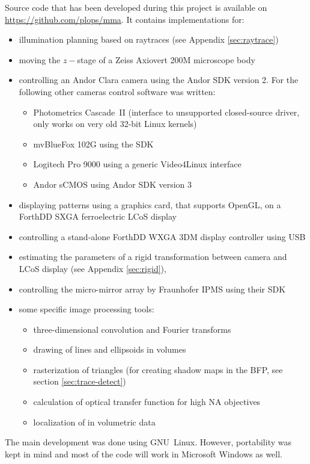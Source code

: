 \documentclass[oneside,a4paper,12pt,BCOR20mm,DIV14]{scrbook}
\begin{document}
Source code that has been developed during this project is available
on \url{https://github.com/plops/mma}.  It contains implementations
for:
\begin{itemize}
\item illumination planning based on raytraces (see Appendix
  \ref{sec:raytrace})
\item moving the $z-$stage of a Zeiss Axiovert 200M microscope body
\item controlling an Andor Clara camera using the Andor SDK version
  2. For the following other cameras control software was written:
  \begin{itemize}
  \item Photometrics Cascade~II (interface to unsupported
    closed-source driver, only works on very old 32-bit Linux kernels)
  \item mvBlueFox 102G using the SDK
  \item Logitech Pro 9000 using a generic Video4Linux interface
  \item Andor sCMOS using Andor SDK version 3
  \end{itemize}
\item displaying patterns using a graphics card, that supports OpenGL,
  on a ForthDD SXGA ferroelectric LCoS display
\item controlling a stand-alone ForthDD WXGA 3DM display controller
  using USB
\item estimating the parameters of a rigid transformation between
  camera and LCoS display (see Appendix \ref{sec:rigid}),
\item controlling the micro-mirror array by Fraunhofer IPMS using
  their SDK
\item some specific image processing tools:
  \begin{itemize}
  \item three-dimensional convolution and Fourier transforms
  \item drawing of lines and ellipsoids in volumes
  \item rasterization of triangles (for creating shadow maps in the
    BFP, see section \ref{sec:trace-detect})
  \item calculation of optical transfer function for high NA
    objectives
  \item localization of in volumetric data \citep{Santella2010}
  \end{itemize}
\end{itemize}
The main development was done using GNU~Linux. However, portability
was kept in mind and most of the code will work in Microsoft Windows
as well.
\end{document}
